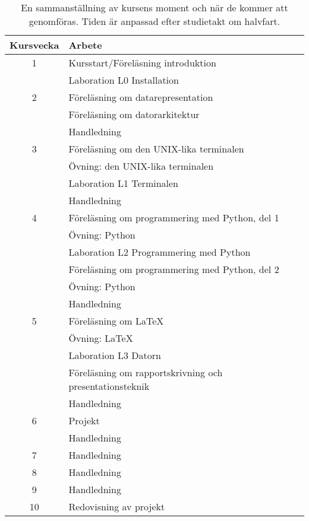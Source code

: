 \documentclass[a4paper,logo]{miunart}
\begin{document}
\begin{table}
	\centering
  \begin{tabular}{cp{9cm}}
    \toprule
		\textbf{Kursvecka}	& \textbf{Arbete} \\
    \midrule
    1	& Kursstart/Föreläsning introduktion \\
      & Laboration L0 Installation \\
    \midrule
    2 & Föreläsning om datarepresentation \\
      & Föreläsning om datorarkitektur \\
      & Handledning \\
    \midrule
    3 & Föreläsning om den UNIX-lika terminalen \\
      & Övning: den UNIX-lika terminalen \\
      & Laboration L1 Terminalen \\
      & Handledning \\
    \midrule
    4 & Föreläsning om programmering med Python, del 1 \\
      & Övning: Python \\
      & Laboration L2 Programmering med Python \\
      & Föreläsning om programmering med Python, del 2 \\
      & Övning: Python \\
      & Handledning \\
    \midrule
    5 & Föreläsning om LaTeX \\
      & Övning: LaTeX \\
      & Laboration L3 Datorn \\
      & Föreläsning om rapportskrivning och presentationsteknik \\
      & Handledning \\
    \midrule
    6 & Projekt \\
      & Handledning \\
    \midrule
    7 & Handledning \\
    \midrule
    8 & Handledning \\
    \midrule
    9 & Handledning \\
    \midrule
    10  & Redovisning av projekt \\
    \bottomrule
  \end{tabular}
  \caption{En sammanställning av kursens moment och när de kommer att 
  genomföras.
  Tiden är anpassad efter studietakt om halvfart.}
	\label{tbl:schema}
\end{table}
\end{document}
